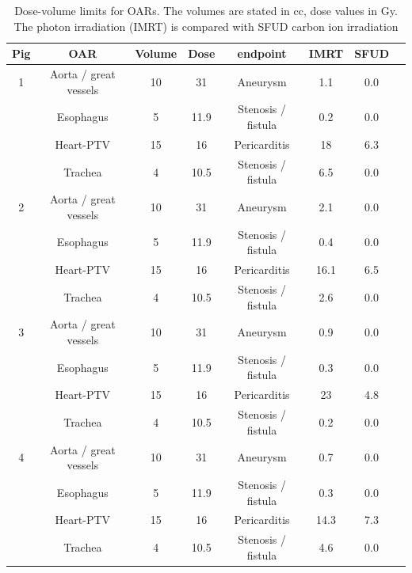 \begin{table}[H]
\footnotesize
  \centering
  \caption{
  Dose-volume limits for OARs. The volumes are stated in cc, dose values in Gy. The photon irradiation (IMRT) is compared with SFUD carbon ion 
  irradiation}
  \begin{tabular}{|c|c||c|c|c||c|c|c|}
    \hline\hline
    Pig & OAR & Volume & Dose & endpoint & IMRT & SFUD \\
    \hline
    1 & Aorta / great vessels & 10 & 31 & Aneurysm & 1.1 & 0.0 \\
    & Esophagus & 5 & 11.9 &  Stenosis / fistula & 0.2 & 0.0 \\
    & Heart-PTV & 15 & 16 & Pericarditis & 18 & 6.3 \\
    & Trachea & 4 & 10.5 & Stenosis / fistula & 6.5 & 0.0 \\
    \hline
    2 & Aorta / great vessels & 10 & 31 & Aneurysm & 2.1 & 0.0 \\
    & Esophagus & 5 & 11.9 &  Stenosis / fistula & 0.4 & 0.0 \\
    & Heart-PTV & 15 & 16 & Pericarditis & 16.1 & 6.5 \\
    & Trachea & 4 & 10.5 & Stenosis / fistula & 2.6 & 0.0 \\
    \hline
    3 & Aorta / great vessels & 10 & 31 & Aneurysm & 0.9 & 0.0 \\
    & Esophagus & 5 & 11.9 &  Stenosis / fistula & 0.3 & 0.0 \\
    & Heart-PTV & 15 & 16 & Pericarditis & 23 &  4.8 \\
    & Trachea & 4 & 10.5 & Stenosis / fistula & 0.2 & 0.0 \\
    \hline
    4 & Aorta / great vessels & 10 & 31 & Aneurysm & 0.7 & 0.0 \\
    & Esophagus & 5 & 11.9 &  Stenosis / fistula & 0.3 & 0.0 \\
    & Heart-PTV & 15 & 16 & Pericarditis &  14.3 & 7.3 \\
    & Trachea & 4 & 10.5 & Stenosis / fistula & 4.6 & 0.0 \\
    \hline\hline
  \end{tabular}
  \label{tab:pig:dosevolume:photons:carbon}
\end{table}

\newpage

